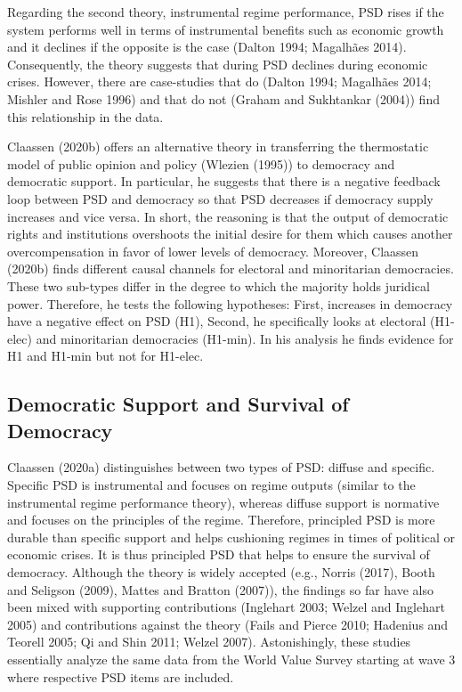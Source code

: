 \documentclass[12pt,english,a4paper,oneside]{article}
\theoremstyle{definition}
\theoremstyle{definition}
\theoremstyle{definition}
\theoremstyle{definition}
\theoremstyle{remark}
\begin{document}
Regarding the second theory, instrumental regime performance, PSD rises if the system performs well in terms of instrumental benefits such as economic growth and it declines if the opposite is the case (Dalton 1994; Magalhães 2014). Consequently, the theory suggests that during PSD declines during economic crises. However, there are case-studies that do (Dalton 1994; Magalhães 2014; Mishler and Rose 1996) and that do not (Graham and Sukhtankar (2004)) find this relationship in the data.

Claassen (2020b) offers an alternative theory in transferring the thermostatic model of public opinion and policy (Wlezien (1995)) to democracy and democratic support. In particular, he suggests that there is a negative feedback loop between PSD and democracy so that PSD decreases if democracy supply increases and vice versa. In short, the reasoning is that the output of democratic rights and institutions overshoots the initial desire for them which causes another overcompensation in favor of lower levels of democracy. Moreover, Claassen (2020b) finds different causal channels for electoral and minoritarian democracies. These two sub-types differ in the degree to which the majority holds juridical power. Therefore, he tests the following hypotheses: First, increases in democracy have a negative effect on PSD (H1), Second, he specifically looks at electoral (H1-elec) and minoritarian democracies (H1-min). In his analysis he finds evidence for H1 and H1-min but not for H1-elec.

\hypertarget{democratic-support-and-survival-of-democracy}{%
\subsection{Democratic Support and Survival of Democracy}\label{democratic-support-and-survival-of-democracy}}

Claassen (2020a) distinguishes between two types of PSD: diffuse and specific. Specific PSD is instrumental and focuses on regime outputs (similar to the instrumental regime performance theory), whereas diffuse support is normative and focuses on the principles of the regime. Therefore, principled PSD is more durable than specific support and helps cushioning regimes in times of political or economic crises. It is thus principled PSD that helps to ensure the survival of democracy. Although the theory is widely accepted (e.g., Norris (2017), Booth and Seligson (2009), Mattes and Bratton (2007)), the findings so far have also been mixed with supporting contributions (Inglehart 2003; Welzel and Inglehart 2005) and contributions against the theory (Fails and Pierce 2010; Hadenius and Teorell 2005; Qi and Shin 2011; Welzel 2007). Astonishingly, these studies essentially analyze the same data from the World Value Survey starting at wave 3 where respective PSD items are included.
\end{document}

